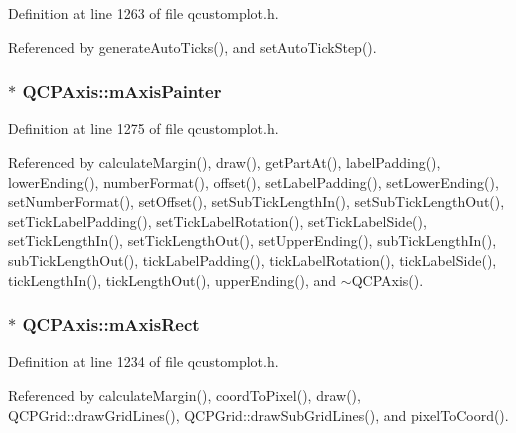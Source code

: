 Definition at line 1263 of file qcustomplot.\+h.



Referenced by generate\+Auto\+Ticks(), and set\+Auto\+Tick\+Step().

\hypertarget{class_q_c_p_axis_aeeae00935bd2dab82d64f32544a90913}{}
\subsubsection[{m\+Axis\+Painter}]{$\ast$ Q\+C\+P\+Axis\+::m\+Axis\+Painter\hspace{0.3cm}{\ttfamily [protected]}}\label{class_q_c_p_axis_aeeae00935bd2dab82d64f32544a90913}


Definition at line 1275 of file qcustomplot.\+h.



Referenced by calculate\+Margin(), draw(), get\+Part\+At(), label\+Padding(), lower\+Ending(), number\+Format(), offset(), set\+Label\+Padding(), set\+Lower\+Ending(), set\+Number\+Format(), set\+Offset(), set\+Sub\+Tick\+Length\+In(), set\+Sub\+Tick\+Length\+Out(), set\+Tick\+Label\+Padding(), set\+Tick\+Label\+Rotation(), set\+Tick\+Label\+Side(), set\+Tick\+Length\+In(), set\+Tick\+Length\+Out(), set\+Upper\+Ending(), sub\+Tick\+Length\+In(), sub\+Tick\+Length\+Out(), tick\+Label\+Padding(), tick\+Label\+Rotation(), tick\+Label\+Side(), tick\+Length\+In(), tick\+Length\+Out(), upper\+Ending(), and $\sim$\+Q\+C\+P\+Axis().

\hypertarget{class_q_c_p_axis_a6f150b65a202f32936997960e331dfcb}{}
\subsubsection[{m\+Axis\+Rect}]{$\ast$ Q\+C\+P\+Axis\+::m\+Axis\+Rect\hspace{0.3cm}{\ttfamily [protected]}}\label{class_q_c_p_axis_a6f150b65a202f32936997960e331dfcb}


Definition at line 1234 of file qcustomplot.\+h.



Referenced by calculate\+Margin(), coord\+To\+Pixel(), draw(), Q\+C\+P\+Grid\+::draw\+Grid\+Lines(), Q\+C\+P\+Grid\+::draw\+Sub\+Grid\+Lines(), and pixel\+To\+Coord().

